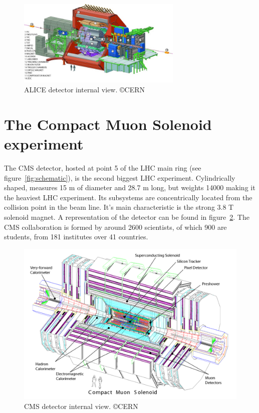 \begin{figure}[!Hhtbp]
  \begin{center}
    \includegraphics[width=0.7\textwidth]{figs/alice2.jpg}
    \caption{ALICE detector internal view. \copyright CERN}
    \label{fig:alicedet}
  \end{center}
\end{figure}

\section{The Compact Muon Solenoid experiment}
\label{sec:CMS}

The CMS detector, hosted at point 5 of the LHC main ring (see figure~\ref{fig:schematic}), is the second biggest LHC experiment. Cylindrically shaped, measures 15 m of diameter and 28.7 m long, but weights 14000 making it the heaviest LHC experiment. Its subsystems are concentrically located from the collision point in the beam line. It's main characteristic is the strong 3.8 T solenoid magnet. A representation of the detector can be found in figure~\ref{fig:cmsdet}. The CMS collaboration is formed by around 2600 scientists, of which 900 are students, from 181 institutes over 41 countries. 

\begin{figure}[!Hhtbp]
  \begin{center}
    \includegraphics[width=\textwidth]{figs/CMS_det.pdf}
    \caption{CMS detector internal view. \copyright CERN}
    \label{fig:cmsdet}
  \end{center}
\end{figure}

